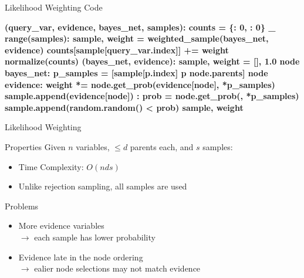 \documentclass[14pt]{beamer}
\begin{document}
\begin{frame}[fragile]{Likelihood Weighting Code}
	\begin{semiverbatim}\scriptsize\bfseries
		 (query_var, evidence, bayes_net, samples):
		    \pause{}
		    counts = \{: \num{0}, : \num{0}\}
		     _  range(samples):
		        sample, weight = weighted_sample(bayes_net, evidence)
		        counts[sample[query_var.index]] += weight
		    \pause{} normalize(counts)
		\pause
		 (bayes_net, evidence):\pause
		    sample, weight = [], \num{1.0}
		     node  bayes_net:
		        p_samples = [sample[p.index]  p  node.parents]
		        \pause{}
		         node  evidence:
		            weight *= node.get_prob(evidence[node], *p_samples)
		            sample.append(evidence[node])
		        \pause{}
		        :
		            prob = node.get_prob(, *p_samples)
		            sample.append(random.random() < prob)
		    \pause{} sample, weight
	\end{semiverbatim}
\end{frame}
\begin{frame}{Likelihood Weighting}
	\begin{block}{Properties}
		Given $n$ variables, $\leq d$ parents each, and $s$ samples:
		\begin{itemize}
			\item Time Complexity: \pause $O(nds)$
			\pause
			\item Unlike rejection sampling, all samples are used
		\end{itemize}
	\end{block}
	\pause
	\begin{block}{Problems}
		\begin{itemize}
			\item More evidence variables \\
			      $\rightarrow$ each sample has lower probability
			\pause
			\item Evidence late in the node ordering \\
			      $\rightarrow$ ealier node selections may not match evidence
		\end{itemize}
	\end{block}
\end{frame}
\end{document}
